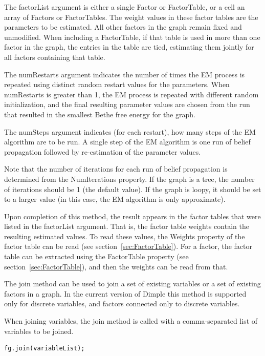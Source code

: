The factorList argument is either a single Factor or FactorTable, or \ifmatlab a cell \fi \ifjava an \fi array of Factors or FactorTables.  The weight values in these factor tables are the parameters to be estimated.  All other factors in the graph remain fixed and unmodified.  When including a FactorTable, if that table is used in more than one factor in the graph, the entries in the table are tied, estimating them jointly for all factors containing that table.

The numRestarts argument indicates the number of times the EM process is repeated using distinct random restart values for the parameters.  When numRestarts is greater than 1, the EM process is repeated with different random initialization, and the final resulting parameter values are chosen from the run that resulted in the smallest Bethe free energy for the graph.

The numSteps argument indicates (for each restart), how many steps of the EM algorithm are to be run.  A single step of the EM algorithm is one run of belief propagation followed by re-estimation of the parameter values.

Note that the number of iterations for each run of belief propagation is determined from the NumIterations property.  If the graph is a tree, the number of iterations should be 1 (the default value).  If the graph is loopy, it should be set to a larger value (in this case, the EM algorithm is only approximate).

Upon completion of this method, the result appears in the factor tables that were listed in the factorList argument.  That is, the factor table weights contain the resulting estimated values.  To read these values, the Weights property of the factor table can be read (see section~\ref{sec:FactorTable}).  For a factor, the factor table can be extracted using the FactorTable property (see section~\ref{sec:FactorTable}), and then the weights can be read from that.



The join method can be used to join a set of existing variables or a set of existing factors in a graph.  In the current version of Dimple this method is supported only for discrete variables, and factors connected only to discrete variables.

When joining variables, the join method is called with a comma-separated list of variables to be joined.

\begin{lstlisting}
fg.join(variableList);
\end{lstlisting}

